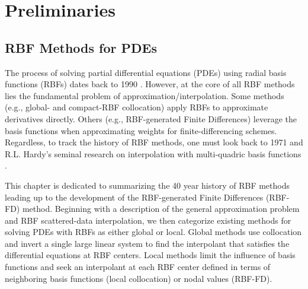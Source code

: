\documentclass{report}
\begin{document}
\fi

{ \graphicspath{{rbffd_methods_content/}} 


\part{Preliminaries}

\chapter{RBF Methods for PDEs}

The process of solving partial differential equations (PDEs) using radial basis functions (RBFs) dates back to 1990 \cite{Kansa1990a,Kansa1990b}. However, at the core of all RBF methods lies the fundamental problem of approximation/interpolation. Some methods (e.g., global- and compact-RBF collocation) apply RBFs to approximate derivatives directly. Others (e.g., RBF-generated Finite Differences) leverage the basis functions when approximating weights for finite-differencing schemes. Regardless, to track the history of RBF methods, one must look back to 1971 and R.L. Hardy's seminal research on interpolation with multi-quadric basis functions \cite{Hardy1971}. 

This chapter is dedicated to summarizing the 40 year history of RBF methods leading up to the development of the RBF-generated Finite Differences (RBF-FD) method. Beginning with a description of the general approximation problem and RBF scattered-data interpolation, we then categorize existing methods for solving PDEs with RBFs as either global or local. Global methods use collocation and invert a single large linear system to find the interpolant that satisfies the differential equations at RBF centers. Local methods limit the influence of basis functions and seek an interpolant at each RBF center defined in terms of neighboring basis functions (local collocation) or nodal values (RBF-FD).

}
\end{document}
